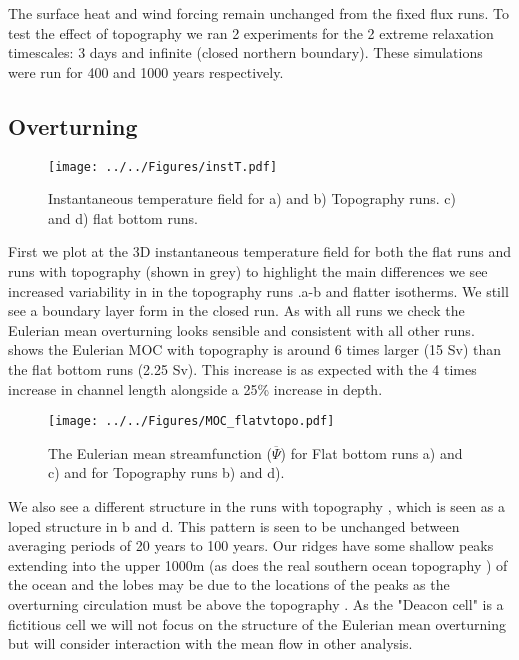 The surface heat and wind forcing remain unchanged from the fixed flux runs. To test the effect of topography we ran 2 experiments for the 2 extreme relaxation timescales: 3 days and infinite (closed northern boundary). These simulations were run for 400 and 1000 years respectively.

\subsection{Overturning}
\begin{figure}[H]
\noindent \texttt{[image: ../../Figures/instT.pdf]} 
\caption{Instantaneous temperature field for a) and b) Topography runs. c) and d) flat bottom runs.}
\label{fig:instT}
\end{figure}

First we plot at the 3D instantaneous temperature field for both the flat runs and runs with topography (shown in grey) to highlight the main differences we see increased variability in in the topography runs .a-b and flatter isotherms. We still see a boundary layer form in the closed run.
As with all runs we check the Eulerian mean overturning looks sensible and consistent with all other runs.  shows the Eulerian MOC with topography is around 6 times larger (15 Sv) than the flat bottom runs (2.25 Sv). This increase is as expected with the 4 times increase in channel length alongside a 25\% increase in depth.
\begin{figure}[H]
\noindent \texttt{[image: ../../Figures/MOC\_flatvtopo.pdf]} 
\caption{The Eulerian mean streamfunction ($\overline{\Psi}$) for Flat bottom runs a) and c) and for Topography runs b) and d).} 
\label{fig:MOC_full}
\end{figure}
We also see a different structure in the runs with topography , which is seen as a loped structure in b and d. This pattern is seen to be unchanged between averaging periods of 20 years to 100 years. Our ridges have some shallow peaks extending into the upper 1000m (as does the real southern ocean topography \citep{Smith and Sandwell, 1997}) of the ocean and the lobes may be due to the locations of the peaks as the overturning circulation must be above the topography \citep{viebahn2012}. As the "Deacon cell" \citep{Doos1994} is a fictitious cell we will not focus on the structure of the Eulerian mean overturning but will consider interaction with the mean flow in other analysis.
